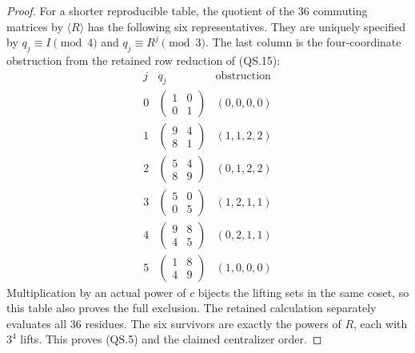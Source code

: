 \begin{proof}
For a shorter reproducible table, the quotient of the
$36$ commuting matrices by $\langle R\rangle$ has the following
six representatives.  They are uniquely specified by
$q_j\equiv I\pmod4$ and $q_j\equiv R^j\pmod3$.
The last column is the four-coordinate obstruction from the
retained row reduction of (QS.15):
\[
\begin{array}{c|c|c}
 j&q_j&\text{obstruction}\\\hline
 0&\left(\begin{smallmatrix}1&0\\0&1\end{smallmatrix}\right)
       &(0,0,0,0)\\
 1&\left(\begin{smallmatrix}9&4\\8&1\end{smallmatrix}\right)
       &(1,1,2,2)\\
 2&\left(\begin{smallmatrix}5&4\\8&9\end{smallmatrix}\right)
       &(0,1,2,2)\\
 3&\left(\begin{smallmatrix}5&0\\0&5\end{smallmatrix}\right)
       &(1,2,1,1)\\
 4&\left(\begin{smallmatrix}9&8\\4&5\end{smallmatrix}\right)
       &(0,2,1,1)\\
 5&\left(\begin{smallmatrix}1&8\\4&9\end{smallmatrix}\right)
       &(1,0,0,0)
\end{array}                                               \tag{QS.16}
\]
Multiplication by an actual power of $c$ bijects the lifting
sets in the same coset, so this table also proves the full
exclusion.  The retained calculation separately evaluates
all $36$ residues.  The six survivors are exactly the powers
of $R$, each with $3^4$ lifts.  This proves (QS.5) and the
claimed centralizer order.


\end{proof}
